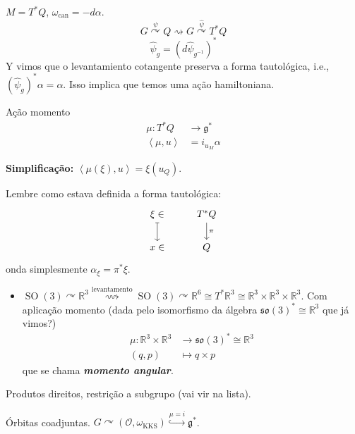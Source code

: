 \begin{example}\leavevmode
	$M=T^*Q$, $\omega_{\operatorname{can}}=-d\alpha$.
	\[G\overset{\psi}{\curvearrowright}Q\rightsquigarrow G\overset{\hat{\psi}}{\curvearrowright}T^*Q\]
	\[\hat{\psi}_g=(d\hat{\psi}_{g^{-1}})^*\]
	Y vimos que o levantamiento cotangente preserva a forma tautológica, i.e., $(\hat{\psi}_{g})^*\alpha=\alpha$. Isso implica que temos uma ação hamiltoniana.

	\begin{thing5}{Ação momento}\leavevmode
		\begin{align*}
			\mu:T^*Q  &\longrightarrow \mathfrak{g}^* \\
			\left<\mu,u\right>  &=i_{u_M}\alpha 
		\end{align*}
		
		\textbf{Simplificação:}  $\left<\mu(\xi),u\right> =\xi(u_Q)$.

		Lembre como estava definida a forma tautológica:
		\[\begin{tikzcd}
			\xi \in\arrow[d,maps to]& T^*Q\arrow[d,"\pi"]\\
			x\in&Q
		\end{tikzcd}\]
		onda simplesmente $\alpha_\xi=\pi^*\xi$.
		
	\end{thing5}
\end{example}

\begin{example}\leavevmode
	\begin{itemize}
	\item $\operatorname{SO}(3) \curvearrowright \mathbb{R}^3\overset{\text{levantamento} }{\rightsquigarrow }\operatorname{SO}(3) \curvearrowright \mathbb{R}^{6}\cong T^*\mathbb{R}^{3}\cong \mathbb{R}^{3}\times \mathbb{R}^{3}\times \mathbb{R}^{3}$. Com aplicação momento (dada pelo isomorfismo da álgebra $\mathfrak{so}(3)^*\cong \mathbb{R}^{3}$ que já vimos?)
		\begin{align*}
			\mu: \mathbb{R}^{3}\times \mathbb{R}^{3} &\longrightarrow \mathfrak{so}(3)^*\cong \mathbb{R}^{3} \\
			(q,p) &\longmapsto q\times p
		\end{align*}
		que se chama \textit{\textbf{momento angular}}.
	\end{itemize}

	\item Produtos direitos, restrição a subgrupo (vai vir na lista).

	\item \'Orbitas coadjuntas. $G \curvearrowright(\mathcal{O},\omega_{\operatorname{KKS}})\overset{\mu=i}{\hookrightarrow }\mathfrak{g}^*$.
\end{example}

